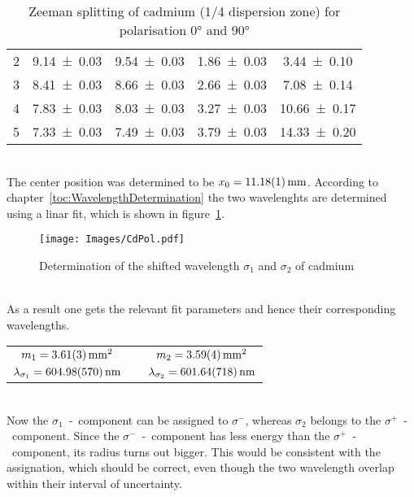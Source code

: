 \begin{table}[ht]
\begin{minipage}{0.48\textwidth}
\begin{adjustbox}{width=\textwidth}
\begin{tabular}{c c c c c}
				2			& \num{9.14 \pm 0.03} 		& \num{9.54 \pm 0.03} 		& \num{1.86 \pm 0.03} 	& \num{3.44 \pm 0.10} 		\\
				3			& \num{8.41 \pm 0.03} 		& \num{8.66 \pm 0.03} 		& \num{2.66 \pm 0.03} 	& \num{7.08 \pm 0.14} 		\\
				4			& \num{7.83 \pm 0.03} 		& \num{8.03 \pm 0.03} 		& \num{3.27 \pm 0.03} 	& \num{10.66 \pm 0.17} 		\\
				5			& \num{7.33 \pm 0.03} 		& \num{7.49 \pm 0.03} 		& \num{3.79 \pm 0.03} 	& \num{14.33 \pm 0.20} 		\\
			\end{tabular}
		\end{adjustbox}
	\end{minipage}
	\caption[Zeeman Splitting of Cd]{Zeeman splitting of cadmium (1/4 dispersion zone) for polarisation \ang{0} and \ang{90}}
\end{table}\\
The center position was determined to be $x_0 = \SI{11.18 \pm 0.01}{\mm}$. 
According to chapter~\ref{toc:WavelengthDetermination} the two wavelenghts are determined using a linar fit, which is shown in figure~\ref{fig:CdShift}.
\begin{figure}[ht]
	\centering
	\texttt{[image: Images/CdPol.pdf]}
	\caption[Determination of the Shifted Wavelength $\sigma_1$ \& $\sigma_2$ of Cd]{Determination of the shifted wavelength $\sigma_1$ and $\sigma_2$ of cadmium}
	\label{fig:CdShift}
\end{figure}\\
As a result one gets the relevant fit parameters and hence their corresponding wavelengths.
\begin{table}[ht]
	\centering
	\begin{tabular}{c p{2.0cm} c}
	$m_1 = \SI{3.61 \pm 0.03}{\mm\squared}$		& & $m_2 = \SI{3.59 \pm 0.04}{\mm\squared}$	\\
	$\lambda_{\sigma_1} = \SI{604.98 \pm 5.70}{\nm}$	& & $\lambda_{\sigma_2} = \SI{601.64 \pm 7.18}{\nm}$
	\end{tabular}
\end{table}\\
Now the $\sigma_1$~-~component can be assigned to $\sigma^-$, whereas $\sigma_2$ belongs to the $\sigma^+$~-~component. 
Since the $\sigma^-$~-~component has less energy than the $\sigma^+$~-~component, its radius turns out bigger. 
This would be consistent with the assignation, which should be correct, even though the two wavelength overlap within their interval of uncertainty. 
